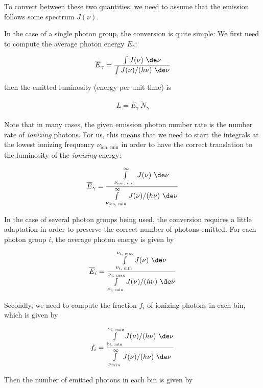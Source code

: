 To convert between these two quantities, we need to assume that the emission follows some spectrum $J(\nu)$.

In the case of a single photon group, the conversion is quite simple: We first need to compute the average photon energy $\overline{E}_\gamma$:

\begin{align}
	\overline{E}_\gamma = \frac{\int J(\nu) \ \de \nu }{\int J(\nu) / (h \nu) \ \de \nu}
\end{align}

then the emitted luminosity (energy per unit time) is

\begin{align}
	L = \overline{E}_\gamma \ \dot{N}_{\gamma}
\end{align}

Note that in many cases, the given emission photon number rate is the number rate of \emph{ionizing} photons. For us, this means that we need to start the integrals at the lowest ionizing frequency $\nu_{\text{ion, min}}$ in order to have the correct translation to the luminosity of the \emph{ionizing} energy:


\begin{align}
	\overline{E}_\gamma = \frac{\int\limits_{\nu_{\text{ion, min}}}^\infty J(\nu) \ \de \nu }{\int\limits_{\nu_{\text{ion, min}}}^\infty J(\nu) / (h \nu) \ \de \nu}
\end{align}


In the case of several photon groups being used, the conversion requires a little adaptation in order to preserve the correct number of photons emitted. For each photon group $i$, the average photon energy is given by

\begin{align}
	\overline{E}_i = \frac{\int\limits_{\nu_{i \text{, min}}}^{\nu_{i \text{, max}}} J(\nu) \ \de \nu }{\int\limits_{\nu_{i \text{, min}}}^{\nu_{i \text{, max}}} J(\nu) / (h \nu) \ \de \nu}
\end{align}


Secondly, we need to compute the fraction $f_i$ of ionizing photons in each bin, which is given by

\begin{align}
	f_i = \frac{\int\limits_{\nu_{i \text{, min}}}^{\nu_{i \text{, max}}} J(\nu) / (h \nu)  \ \de \nu }{\int\limits_{\nu_{min}}^{\infty} J(\nu) / (h \nu) \ \de \nu}
\end{align}

Then the number of emitted photons in each bin is given by

